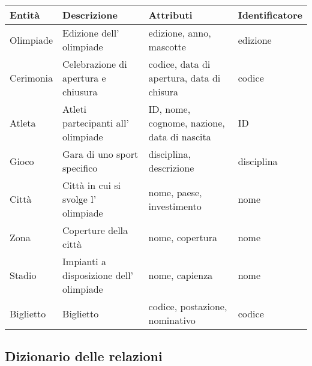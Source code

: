 \documentclass[paper=a4, fontsize=12 pt]{scrartcl} %
\begin{document}
	
	\begin{table}[H]
		\centering
		\begin{tabular}{ ||p{3.5cm}|p{3.5cm}|p{3.5cm}|p{3.5cm}||  }
			\hline
			\hline
			\textbf{Entità} & \textbf{Descrizione} & \textbf{Attributi} & \textbf{Identificatore}\\
			
			\hline
			\hline
			
			Olimpiade   & Edizione dell' olimpiade   & edizione, anno, mascotte& edizione \\
			\hline
			Cerimonia &   Celebrazione di apertura e chiusura  & codice, data di apertura, data di chisura   & codice \\
			\hline
			Atleta & Atleti partecipanti all' olimpiade & ID, nome, cognome, nazione, data di nascita & ID \\
			\hline
			Gioco    & Gara di uno sport specifico & disciplina, descrizione & disciplina \\
			\hline
			Città &   Città in cui si svolge l' olimpiade  & nome, paese, investimento & nome \\
			\hline
			Zona & Coperture della città & nome, copertura & nome \\
			\hline
			Stadio & Impianti a disposizione dell' olimpiade  & nome, capienza & nome \\
			\hline
			Biglietto& Biglietto  & codice, postazione, nominativo   & codice \\
			\hline
			\hline
		\end{tabular}
	\end{table}
	
	\subsection{Dizionario delle relazioni}
	
\end{document}

